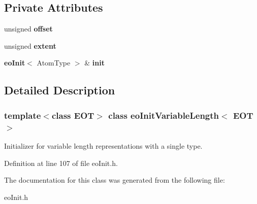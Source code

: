 \subsection*{Private Attributes}
\begin{CompactItemize}
\item 
unsigned {\bf offset}\label{classeo_init_variable_length_r0}

\item 
unsigned {\bf extent}\label{classeo_init_variable_length_r1}

\item 
{\bf eo\-Init}$<$ Atom\-Type $>$ \& {\bf init}\label{classeo_init_variable_length_r2}

\end{CompactItemize}


\subsection{Detailed Description}
\subsubsection*{template$<$class EOT$>$ class eo\-Init\-Variable\-Length$<$ EOT $>$}

Initializer for variable length representations with a single type. 



Definition at line 107 of file eo\-Init.h.

The documentation for this class was generated from the following file:\begin{CompactItemize}
\item 
eo\-Init.h\end{CompactItemize}
